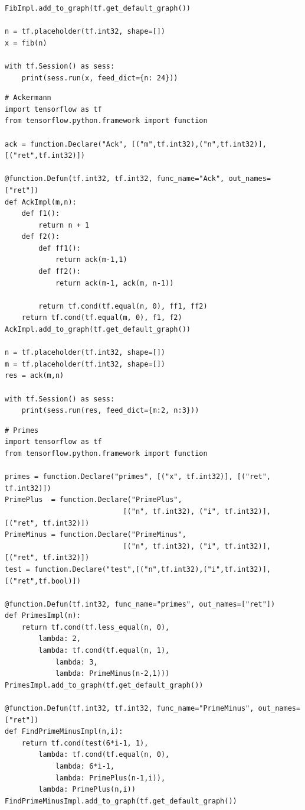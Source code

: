 \documentclass[ack,preface]{dithesis}
\begin{document}
\begin{appendix}
\begin{lstlisting}
FibImpl.add_to_graph(tf.get_default_graph())

n = tf.placeholder(tf.int32, shape=[])
x = fib(n)

with tf.Session() as sess:
	print(sess.run(x, feed_dict={n: 24}))

\end{lstlisting}

\begin{lstlisting}
# Ackermann
import tensorflow as tf
from tensorflow.python.framework import function

ack = function.Declare("Ack", [("m",tf.int32),("n",tf.int32)],[("ret",tf.int32)])

@function.Defun(tf.int32, tf.int32, func_name="Ack", out_names=["ret"])
def AckImpl(m,n):
	def f1(): 
		return n + 1
	def f2():
		def ff1():
			return ack(m-1,1)
		def ff2():
			return ack(m-1, ack(m, n-1))

		return tf.cond(tf.equal(n, 0), ff1, ff2)
	return tf.cond(tf.equal(m, 0), f1, f2)
AckImpl.add_to_graph(tf.get_default_graph())

n = tf.placeholder(tf.int32, shape=[])
m = tf.placeholder(tf.int32, shape=[])
res = ack(m,n)

with tf.Session() as sess:
	print(sess.run(res, feed_dict={m:2, n:3}))
\end{lstlisting}

\begin{lstlisting}
# Primes
import tensorflow as tf
from tensorflow.python.framework import function

primes = function.Declare("primes", [("x", tf.int32)], [("ret", tf.int32)])
PrimePlus  = function.Declare("PrimePlus",  
							[("n", tf.int32), ("i", tf.int32)], [("ret", tf.int32)])
PrimeMinus = function.Declare("PrimeMinus", 
							[("n", tf.int32), ("i", tf.int32)], [("ret", tf.int32)])
test = function.Declare("test",[("n",tf.int32),("i",tf.int32)],[("ret",tf.bool)])

@function.Defun(tf.int32, func_name="primes", out_names=["ret"])
def PrimesImpl(n):
	return tf.cond(tf.less_equal(n, 0),
		lambda: 2,
		lambda: tf.cond(tf.equal(n, 1),
			lambda: 3,
			lambda: PrimeMinus(n-2,1)))
PrimesImpl.add_to_graph(tf.get_default_graph())

@function.Defun(tf.int32, tf.int32, func_name="PrimeMinus", out_names=["ret"])
def FindPrimeMinusImpl(n,i):
	return tf.cond(test(6*i-1, 1),
		lambda: tf.cond(tf.equal(n, 0),
			lambda: 6*i-1,
			lambda: PrimePlus(n-1,i)),
		lambda: PrimePlus(n,i))
FindPrimeMinusImpl.add_to_graph(tf.get_default_graph())


\end{lstlisting}
\end{appendix}
\end{document}

